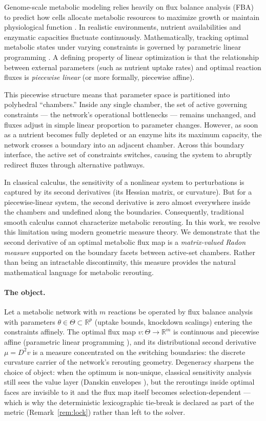 \documentclass[11pt,a4paper]{article}
\theoremstyle{plain}
\theoremstyle{definition}
\theoremstyle{remark}
\newcommand{\RR}{\mathbb{R}}
\begin{document}
Genome-scale metabolic modeling relies heavily on flux balance
analysis (FBA) to predict how cells allocate metabolic resources to
maximize growth or maintain physiological function \citep{varma1994,
orth2010, lewis2010}. In realistic environments, nutrient
availabilities and enzymatic capacities fluctuate continuously.
Mathematically, tracking optimal metabolic states under varying
constraints is governed by parametric linear programming
\citep{borrelli2003}. A defining property of linear optimization is
that the relationship between external parameters (such as nutrient
uptake rates) and optimal reaction fluxes is \emph{piecewise linear}
(or more formally, piecewise affine).

This piecewise structure means that parameter space is partitioned
into polyhedral ``chambers.'' Inside any single chamber, the set of
active governing constraints --- the network's operational
bottlenecks --- remains unchanged, and fluxes adjust in simple linear
proportion to parameter changes. However, as soon as a nutrient
becomes fully depleted or an enzyme hits its maximum capacity, the
network crosses a boundary into an adjacent chamber. Across this
boundary interface, the active set of constraints switches, causing
the system to abruptly redirect fluxes through alternative pathways.

In classical calculus, the sensitivity of a nonlinear system to
perturbations is captured by its second derivatives (its Hessian
matrix, or curvature). But for a piecewise-linear system, the second
derivative is zero almost everywhere inside the chambers and
undefined along the boundaries. Consequently, traditional smooth
calculus cannot characterize metabolic rerouting. In this work, we
resolve this limitation using modern geometric measure theory. We
demonstrate that the second derivative of an optimal metabolic flux
map is a \emph{matrix-valued Radon measure} supported on the boundary
facets between active-set chambers. Rather than being an intractable
discontinuity, this measure provides the natural mathematical
language for metabolic rerouting.

\paragraph{The object.}
Let a metabolic network with $m$ reactions be operated by flux balance
analysis \citep{varma1994, orth2010} with parameters $\theta \in \Theta \subset \RR^p$
(uptake bounds, knockdown scalings) entering the constraints
affinely. The optimal flux map $v : \Theta \to \RR^m$ is continuous
and piecewise affine (parametric linear programming
\citep{borrelli2003}), and its distributional second derivative
$\mu = D^2 v$ is a measure concentrated on the switching boundaries:
the discrete curvature carrier of the network's rerouting geometry.
Degeneracy sharpens the choice of object: when the optimum is
non-unique, classical sensitivity analysis still sees the value layer
(Danskin envelopes \citep{danskin1967}), but the reroutings inside
optimal faces are invisible to it and the flux map itself becomes
selection-dependent --- which is why the deterministic lexicographic
tie-break is declared as part of the metric (Remark~\ref{rem:lock})
rather than left to the solver.
\end{document}
